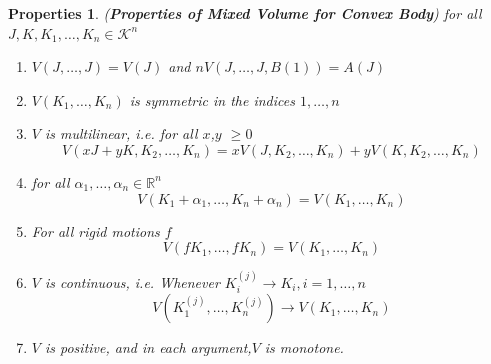 \documentclass[oneside]{book}
\newtheorem{properties}{Properties}[section]
\begin{document}
	\begin{properties} (\textbf{Properties of Mixed Volume for Convex Body})
		\label{prop :2}
		for all $J, K, K_{1}, \ldots, K_{n} 
		\in \mathcal{K}^{n}$ \\ 
		\begin{enumerate}
			
			\item
			$V(J, \ldots, J)=V(J)$ and $ nV(J, \ldots, J, B(1))=A(J)$ 
			
			\item 
			$V\left(K_{1}, \ldots, K_{n}\right)$ is symmetric in the indices $1,\ldots, n$
			\item
			$V$ is multilinear, i.e.
			for all $ x$,$y$ $\geq 0 $
			$$
			V\left(x J+y K, K_{2}, \ldots, K_{n}\right)=x V\left(J, K_{2}, \ldots, K_{n}\right)+y V\left(K, K_{2}, \ldots, K_{n}\right)
			$$
			\item
			for all $\alpha_{1}, \ldots, \alpha_{n} \in \mathbb{R}^{n}$
			$$
			V\left(K_{1}+\alpha_{1}, \ldots, K_{n}+\alpha_{n}\right)=V\left(K_{1}, \ldots, K_{n}\right)
			$$
			\item  
			For all rigid motions $f$ 
			$$ 
			V\left(f K_{1}, \ldots, f K_{n}\right)=V\left(K_{1}, \ldots, K_{n}\right)
			$$ 
			\item
			$V$ is continuous, i.e.
			Whenever $K_{i}^{(j)} \rightarrow K_{i}, i=1, \ldots, n$
			\[
			V\left(K_{1}^{(j)}, \ldots, K_{n}^{(j)}\right) \rightarrow V\left(K_{1}, \ldots, K_{n}\right)
			\]
			\item $V$ is positive, and in each argument,$V$ is monotone.	 
			
		\end{enumerate}
	\end{properties}
	
\end{document}
